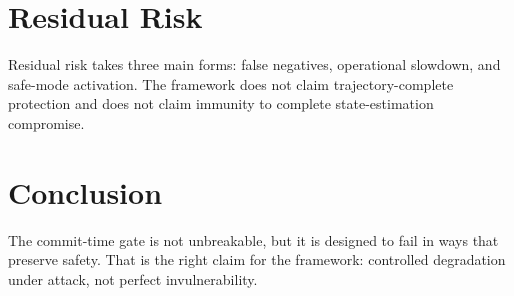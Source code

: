 \documentclass[letterpaper,10pt,conference]{ieeeconf}
\begin{document}
\section{Residual Risk}
Residual risk takes three main forms: false negatives, operational slowdown, and safe-mode activation. The framework does not claim trajectory-complete protection and does not claim immunity to complete state-estimation compromise.
\section{Conclusion}
The commit-time gate is not unbreakable, but it is designed to fail in ways that preserve safety. That is the right claim for the framework: controlled degradation under attack, not perfect invulnerability.
\end{document}
